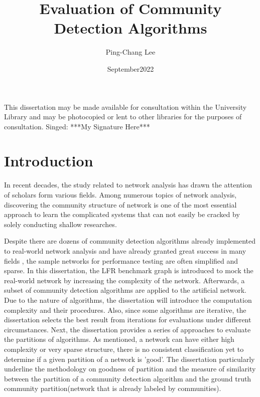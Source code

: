 \documentclass[12pt]{article}
\title{Evaluation of Community Detection Algorithms}
\author{Ping-Chang Lee}
\affil{MSc in Data Science \& Statistics \\ The University of Bath}
\date{{September}{2022}}
\begin{document}
\maketitle
\pagebreak

    
\bigbreak\bigbreak\bigbreak
\bigbreak\bigbreak\bigbreak
\bigbreak\bigbreak\bigbreak

This dissertation may be made available for consultation within the University Library and may be photocopied or lent to other libraries for the purposes of consultation.
\bigbreak\bigbreak\bigbreak
Singed: ***My Signature Here***
\pagebreak


\tableofcontents
\pagebreak

\section{Introduction}
In recent decades, the study related to network analysis has drawn the attention of scholars form various fields. Among numerous topics of network analysis, discovering the community structure of network is one of the most essential approach to learn the complicated systems that can not easily be cracked by solely conducting shallow researches\cite{1}. 

\bigskip

Despite there are dozens of community detection algorithms already implemented to real-world network analysis and have already granted great success in many fields \cite{2,3}, the sample networks for performance testing are often simplified and sparse. In this dissertation, the LFR benchmark graph is introduced to mock the real-world network by increasing the complexity of the network. Afterwards, a subset of community detection algorithms are applied to the artificial network. Due to the nature of algorithms, the dissertation will introduce the computation complexity and their procedures. Also, since some algorithms are iterative, the dissertation selects the best result from iterations for evaluations under different circumstances. Next, the dissertation provides a series of approaches to evaluate the partitions of algorithms. As mentioned, a network can have either high complexity or very sparse structure, there is no consistent classification yet to determine if a given partition of a network is 'good'. The dissertation particularly underline the methodology on goodness of partition and the measure of similarity between the partition of a community detection algorithm and the ground truth community partition(network that is already labeled by communities).
\end{document}
